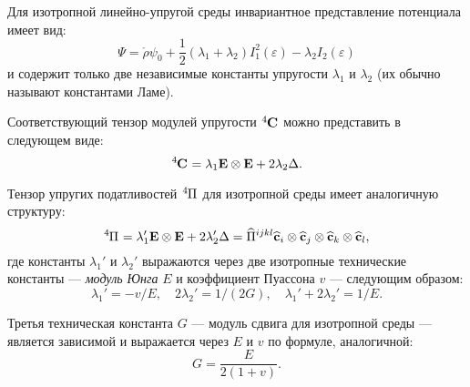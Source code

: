 
Для изотропной линейно-упругой среды инвариантное представление потенциала имеет вид:
\begin{equation}
	\Psi = \mathring{\rho} \psi_0 + \frac{1}{2} \left(\lambda_1 + \lambda_2\right) I^2_1(\varepsilon) - \lambda_2 I_2(\varepsilon)
\end{equation}
и содержит только две независимые константы упругости $\lambda_1$ и $\lambda_2$ (их обычно называют константами Ламе). 

Соответствующий тензор модулей упругости $\tensor[^4]{\mathbf{C}}{}$ можно представить в следующем виде:
\begin{equation}
	\tensor[^4]{\mathbf{C}}{} = \lambda_1 \mathbf{E} \otimes \mathbf{E} + 2 \lambda_2 \Delta.
\end{equation}

Тензор упругих податливостей $\tensor[^4]{\Pi}{}$ для изотропной среды имеет аналогичную структуру:
\begin{equation}
	\tensor[^4]{\Pi}{} = \lambda'_1 \mathbf{E} \otimes \mathbf{E} + 2 \lambda_2' \Delta = \widehat{\Pi}^{ijkl} \widehat{\mathbf{c}}_i \otimes \widehat{\mathbf{c}}_j \otimes \widehat{\mathbf{c}}_k \otimes \widehat{\mathbf{c}}_l,
\end{equation}
где константы $\lambda_1'$ и $\lambda_2'$ выражаются через две изотропные технические константы --- \textit{модуль Юнга} $E$ и коэффициент Пуассона $v$ --- следующим образом:
\begin{equation}
	\lambda_1' = - v/E, \quad 2 \lambda_2' = 1/\left(2G\right), \quad \lambda_1' + 2 \lambda_2' = 1/E.
\end{equation}

Третья техническая константа $G$ --- модуль сдвига для изотропной среды --- является зависимой и выражается через $E$ и $v$ по формуле, аналогичной:
\begin{equation}
	G = \frac{E}{2(1 + v)}.
\end{equation}

